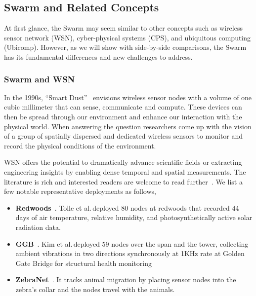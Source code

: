 \subsection{Swarm and Related Concepts}
\label{sec:swarm-relat-conc}

At first glance, the Swarm may seem similar to other concepts such as wireless
sensor network (WSN), cyber-physical systems (CPS), and ubiquitous computing
(Ubicomp). However, as we will show with side-by-side comparisons, the Swarm has
its fundamental differences and new challenges to address.

\subsubsection{Swarm and WSN}
\label{sec:swarm-wsn}

In the 1990s, ``Smart Dust''~\cite{kahn1999next} envisions wireless sensor nodes
with a volume of one cubic millimeter that can sense, communicate and
compute. These devices can then be spread through our environment and enhance
our interaction with the physical world. When answering the question
researchers come up with the vision of a group of spatially dispersed and
dedicated wireless sensors to monitor and record the physical conditions of the
environment.

WSN offers the potential to dramatically advance scientific fields or extracting
engineering insights by enabling dense temporal and spatial measurements. The
literature is rich and interested readers are welcome to read
further~\cite{akyildiz2002wireless, zhao2009wireless}. We list a few notable
representative deployments as follows,

\begin{itemize}[itemsep=5pt]
\item \textbf{Redwoods}~\cite{tolle2005macroscope}. Tolle et al.\,deployed 80
  nodes at redwoods that recorded 44 days of air temperature, relative humidity,
  and photosynthetically active solar radiation data.
\item \textbf{GGB}~\cite{kim2007health}. Kim et al.\,deployed 59 nodes over the
  span and the tower, collecting ambient vibrations in two directions
  synchronously at 1KHz rate at Golden Gate Bridge for structural health
  monitoring
\item \textbf{ZebraNet}~\cite{zhang2005habitat}. It tracks animal migration by
  placing sensor nodes into the zebra's collar and the nodes travel with the
  animals.
\end{itemize}

